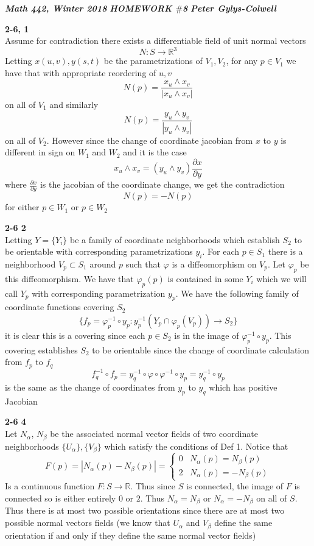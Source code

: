 \documentclass[12pt]{article}
\newenvironment{ques}[1]{\textbf{#1}\vspace{1 mm}\\ }{\bigskip}
\theoremstyle{definition}
\newcommand{\R}{\mathbb R}
\renewcommand{\a}{\alpha}
\renewcommand{\b}{\beta}
\begin{document}
\noindent \textit{\textbf{Math 442, Winter 2018}} \hspace{1.3cm}
\textit{\textbf{HOMEWORK $\#$8}} \hspace{1.3cm} \textit{\textbf{Peter
Gylys-Colwell}} 

\vspace{1cm}

\begin{ques}{2-6, 1}
	Assume for contradiction there exists a differentiable field of unit normal vectors
	$$N:S \to \R^3$$
	Letting $x(u,v), y(s,t)$ be the parametrizations of
	$V_1,V_2$, for any $p \in V_1$ we have that with appropriate reordering of $u,v$
	$$N(p) = \frac{x_u \wedge x_v}{|x_u \wedge x_v|}$$
	on all of $V_1$ and similarly
	$$N(p) = \frac{y_u \wedge y_v}{|y_u \wedge y_v|}$$
	on all of $V_2$. However since the change of coordinate jacobian from
	$x$ to $y$ is different in sign on $W_1$ and $W_2$ and it is the case
	$$x_u \wedge x_v = (y_u \wedge y_v) \frac{\partial x}{\partial y}$$
	where $\frac{\partial x}{\partial y}$ is the jacobian of the coordinate
	change, we get the contradiction
	$$N(p) = -N(p)$$
	for either $p \in W_1$ or $p \in W_2$
\end{ques}

\begin{ques}{2-6 2}
	Letting $Y = \{Y_i\}$ be a family of coordinate neighborhoods which establish
	$S_2$ to be orientable with corresponding parametrizations $y_i$. For each
	$p \in S_1$ there is a neighborhood $V_p \subset S_1$ around $p$ such
	that $\varphi$ is a diffeomorphism on $V_p$. Let $\varphi_p$ be this
	diffeomorphism. We have that $\varphi_p(p)$ is contained in some $Y_i$
	which we will call $Y_p$ with corresponding parametrization $y_p$. We have
	the following family of coordinate functions covering $S_2$
	$$\{f_p = \varphi_p^{-1} \circ y_p: y_p^{-1}(Y_p \cap \varphi_p(V_p)) \to S_2\}$$
	it is clear this is a covering since each $p \in S_2$ is in the image of
	$\varphi_p^{-1} \circ y_p$. This covering establishes $S_2$ to be
	orientable since the change of coordinate calculation from $f_p$ to $f_q$
	$$f_q^{-1} \circ f_p = y^{-1}_q \circ \varphi \circ \varphi^{-1} \circ y_p
	= y_q^{-1} \circ y_p$$
	is the same as the change of coordinates from $y_p$ to $y_q$ which has
	positive Jacobian
\end{ques}

\begin{ques}{2-6 4}
	Let $N_\a$, $N_\b$ be the associated normal vector fields of
	two coordinate neighborhoods $\{U_\a\}, \{V_\b\}$ which satisfy the
	conditions of Def 1. Notice that
	$$F(p) = |N_\a(p) - N_\b(p)| = 
	\begin{cases}
	0 & N_\a(p) = N_\b(p)\\
	2 & N_\a(p) = -N_\b(p)
	\end{cases}$$
	Is a continuous function $F:S \to \R$. Thus since $S$ is connected, the
	image of $F$ is connected so is either entirely $0$ or $2$. Thus $N_\a =
	N_\b$ or $N_\a = -N_\b$ on all of $S$. Thus there is at most two possible
	orientations since there are at most two possible normal vectors fields (we
	know that $U_\a$ and $V_\b$ define the same orientation if and only if they
	define the same normal vector fields)
\end{ques}
\end{document}
